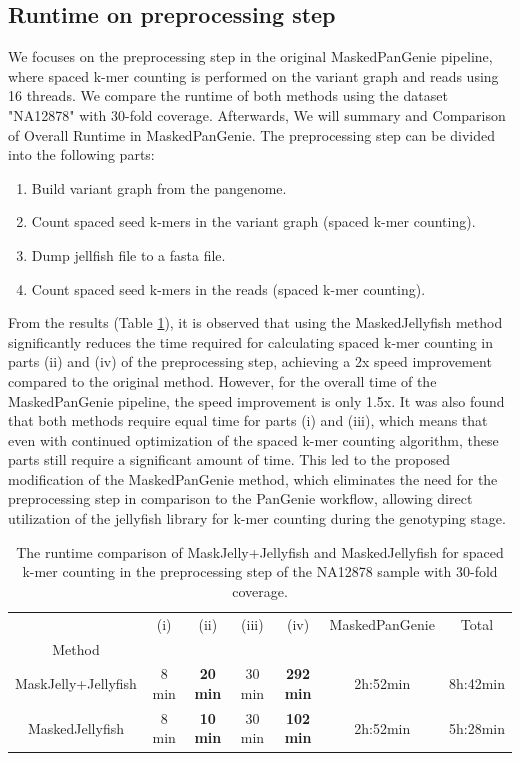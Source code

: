 \documentclass{PHlab-thesis}
\begin{document}
\subsection{Runtime on preprocessing step}
We focuses on the preprocessing step in the original MaskedPanGenie pipeline, where spaced k-mer counting is performed on the variant graph and reads using 16 threads. We compare the runtime of both methods using the dataset "NA12878" with 30-fold coverage. Afterwards, We will summary and Comparison of Overall Runtime in MaskedPanGenie. The preprocessing step can be divided into the following parts:
\begin{enumerate}[label=(\roman*)]
\item Build variant graph from the pangenome.
\item Count spaced seed k-mers in the variant graph (spaced k-mer counting).
\item Dump jellfish file to a fasta file.
\item Count spaced seed k-mers in the reads (spaced k-mer counting).
\end{enumerate}
From the results (Table \ref{table:MaskedJellyfish}), it is observed that using the MaskedJellyfish method significantly reduces the time required for calculating spaced k-mer counting in parts (ii) and (iv) of the preprocessing step, achieving a 2x speed improvement compared to the original method. However, for the overall time of the MaskedPanGenie pipeline, the speed improvement is only 1.5x. It was also found that both methods require equal time for parts (i) and (iii), which means that even with continued optimization of the spaced k-mer counting algorithm, these parts still require a significant amount of time. This led to the proposed modification of the MaskedPanGenie method, which eliminates the need for the preprocessing step in comparison to the PanGenie workflow, allowing direct utilization of the jellyfish library for k-mer counting during the genotyping stage.
\begin{table}[ht!]
	\centering
	\begin{tabular*}{\textwidth}{@{\extracolsep{\fill}}ccccccc@{\extracolsep{\fill}}}
        \toprule
         & (i) & (ii) & (iii) & (iv) & MaskedPanGenie & Total\\
         Method & & & & & &\\
        \midrule
        MaskJelly+Jellyfish& 8 min & \textbf{20 min} & 30 min & \textbf{292 min} & 2h:52min & 8h:42min\\
        MaskedJellyfish& 8 min & \textbf{10 min} & 30 min & \textbf{102 min} & 2h:52min & 5h:28min\\
        \bottomrule 
	\end{tabular*}
	\caption{The runtime comparison of MaskJelly+Jellyfish and MaskedJellyfish for spaced k-mer counting in the preprocessing step of the NA12878 sample with 30-fold coverage.}
	\label{table:MaskedJellyfish}
\end{table}
\end{document}
